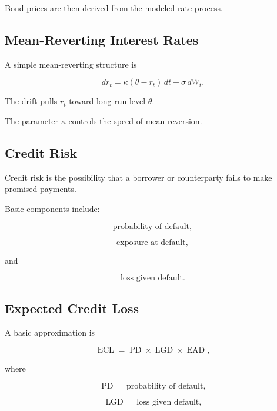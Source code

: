 Bond prices are then derived from the modeled rate process.

\subsection{Mean-Reverting Interest Rates}
\label{subsec:mean-reverting-interest-rates}

A simple mean-reverting structure is

\[
\boxed{
dr_t
=
\kappa(\theta-r_t)\,dt
+
\sigma\,dW_t.
}
\]

The drift pulls \(r_t\) toward long-run level \(\theta\).

The parameter \(\kappa\) controls the speed of mean reversion.

\subsection{Credit Risk}
\label{subsec:credit-risk}

Credit risk is the possibility that a borrower or counterparty fails to make
promised payments.

Basic components include:

\[
\boxed{
\text{probability of default},
}
\]

\[
\boxed{
\text{exposure at default},
}
\]

and

\[
\boxed{
\text{loss given default}.
}
\]

\subsection{Expected Credit Loss}
\label{subsec:expected-credit-loss}

A basic approximation is

\[
\boxed{
\operatorname{ECL}
=
\operatorname{PD}
\times
\operatorname{LGD}
\times
\operatorname{EAD},
}
\]

where

\[
\operatorname{PD}
=
\text{probability of default},
\]

\[
\operatorname{LGD}
=
\text{loss given default},
\]

